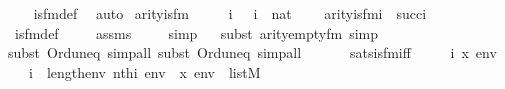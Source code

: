 \begin{isabellebody}
%
\isadelimproof
\ \ %
\endisadelimproof
%
\isatagproof
{}\isamarkupfalse%
\ is{\isacharunderscore}{\kern0pt}{}{\isacharunderscore}{\kern0pt}fm{\isacharunderscore}{\kern0pt}def\ \isamarkupfalse%
\ auto%
\endisatagproof
{\isafoldproof}%
%
\isadelimproof
\isanewline
%
\endisadelimproof
\isanewline
{}\isamarkupfalse%
\ arity{\isacharunderscore}{\kern0pt}is{\isacharunderscore}{\kern0pt}{}{\isacharunderscore}{\kern0pt}fm\ {\isacharcolon}{\kern0pt}\ \isanewline
\ \ \ i\ \ \ {\isachardoublequoteopen}i\ {\isasymin}\ nat{\isachardoublequoteclose}\ \isanewline
\ \ \ {\isachardoublequoteopen}arity{\isacharparenleft}{\kern0pt}is{\isacharunderscore}{\kern0pt}{}{\isacharunderscore}{\kern0pt}fm{\isacharparenleft}{\kern0pt}i{\isacharparenright}{\kern0pt}{\isacharparenright}{\kern0pt}\ {\isacharequal}{\kern0pt}\ succ{\isacharparenleft}{\kern0pt}i{\isacharparenright}{\kern0pt}{\isachardoublequoteclose}\ \isanewline
%
\isadelimproof
\ \ %
\endisadelimproof
%
\isatagproof
{}\isamarkupfalse%
\ is{\isacharunderscore}{\kern0pt}{}{\isacharunderscore}{\kern0pt}fm{\isacharunderscore}{\kern0pt}def\ \isanewline
\ \ \isamarkupfalse%
\ assms\ \isanewline
\ \ \isamarkupfalse%
\ simp\isanewline
\ \ \isamarkupfalse%
{\isacharparenleft}{\kern0pt}subst\ arity{\isacharunderscore}{\kern0pt}empty{\isacharunderscore}{\kern0pt}fm{\isacharcomma}{\kern0pt}\ simp{\isacharparenright}{\kern0pt}\isanewline
\ \ \isamarkupfalse%
{\isacharparenleft}{\kern0pt}subst\ Ord{\isacharunderscore}{\kern0pt}un{\isacharunderscore}{\kern0pt}eq{}{\isacharcomma}{\kern0pt}\ simp{\isacharunderscore}{\kern0pt}all{\isacharcomma}{\kern0pt}\ subst\ Ord{\isacharunderscore}{\kern0pt}un{\isacharunderscore}{\kern0pt}eq{}{\isacharcomma}{\kern0pt}\ simp{\isacharunderscore}{\kern0pt}all{\isacharparenright}{\kern0pt}\isanewline
\ \ \isamarkupfalse%
%
\endisatagproof
{\isafoldproof}%
%
\isadelimproof
\isanewline
%
\endisadelimproof
\ \ \isanewline
{}\isamarkupfalse%
\ sats{\isacharunderscore}{\kern0pt}is{\isacharunderscore}{\kern0pt}{}{\isacharunderscore}{\kern0pt}fm{\isacharunderscore}{\kern0pt}iff\ {\isacharcolon}{\kern0pt}\ \isanewline
\ \ \ i\ x\ env\ \isanewline
\ \ \ {\isachardoublequoteopen}i\ {\isacharless}{\kern0pt}\ length{\isacharparenleft}{\kern0pt}env{\isacharparenright}{\kern0pt}{\isachardoublequoteclose}\ {\isachardoublequoteopen}nth{\isacharparenleft}{\kern0pt}i{\isacharcomma}{\kern0pt}\ env{\isacharparenright}{\kern0pt}\ {\isacharequal}{\kern0pt}\ x{\isachardoublequoteclose}\ {\isachardoublequoteopen}env\ {\isasymin}\ list{\isacharparenleft}{\kern0pt}M{\isacharparenright}{\kern0pt}{\isachardoublequoteclose}\isanewline

\end{isabellebody}
